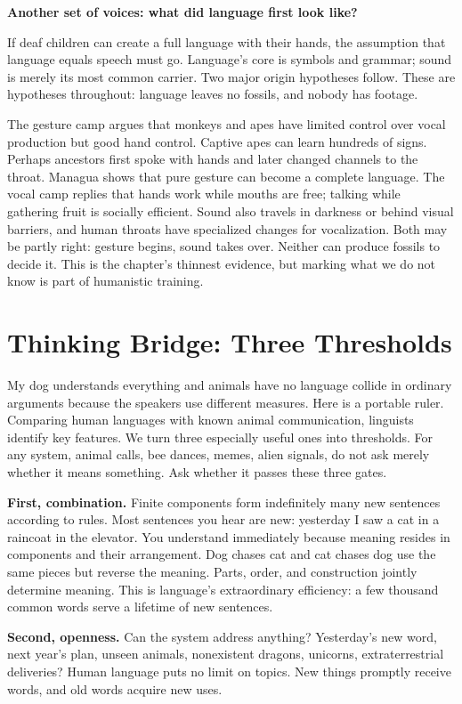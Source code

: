 \textbf{Another set of voices: what did language first look like?}

If deaf children can create a full language with their hands, the assumption that language equals speech must go. Language's core is symbols and grammar; sound is merely its most common carrier. Two major origin hypotheses follow. These are hypotheses throughout: language leaves no fossils, and nobody has footage.

The gesture camp argues that monkeys and apes have limited control over vocal production but good hand control. Captive apes can learn hundreds of signs. Perhaps ancestors first spoke with hands and later changed channels to the throat. Managua shows that pure gesture can become a complete language. The vocal camp replies that hands work while mouths are free; talking while gathering fruit is socially efficient. Sound also travels in darkness or behind visual barriers, and human throats have specialized changes for vocalization. Both may be partly right: gesture begins, sound takes over. Neither can produce fossils to decide it. This is the chapter's thinnest evidence, but marking what we do not know is part of humanistic training.

\section{Thinking Bridge: Three Thresholds}
My dog understands everything and animals have no language collide in ordinary arguments because the speakers use different measures. Here is a portable ruler. Comparing human languages with known animal communication, linguists identify key features. We turn three especially useful ones into thresholds. For any system, animal calls, bee dances, memes, alien signals, do not ask merely whether it means something. Ask whether it passes these three gates.

\textbf{First, combination.} Finite components form indefinitely many new sentences according to rules. Most sentences you hear are new: yesterday I saw a cat in a raincoat in the elevator. You understand immediately because meaning resides in components and their arrangement. Dog chases cat and cat chases dog use the same pieces but reverse the meaning. Parts, order, and construction jointly determine meaning. This is language's extraordinary efficiency: a few thousand common words serve a lifetime of new sentences.

\textbf{Second, openness.} Can the system address anything? Yesterday's new word, next year's plan, unseen animals, nonexistent dragons, unicorns, extraterrestrial deliveries? Human language puts no limit on topics. New things promptly receive words, and old words acquire new uses.

